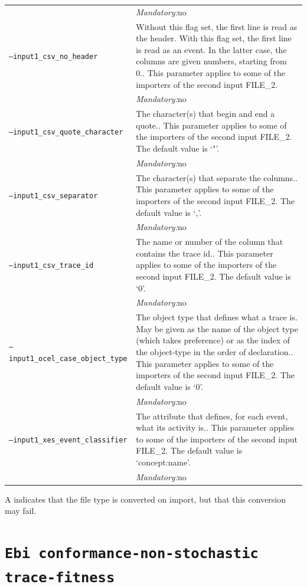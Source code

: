 {\begin{tabularx}{\linewidth}{lX}
&\textit{Mandatory:}\quad no\\
\texttt{--input1\_csv\_no\_header} & Without this flag set, the first line is read as the header. 
    With this flag set, the first line is read as an event. In the latter case, the columns are given numbers, starting from 0.. This parameter applies to some of the importers of the second input FILE\_2. \\
&\textit{Mandatory:}\quad no\\
\texttt{--input1\_csv\_quote\_character} & The character(s) that begin and end a quote.. This parameter applies to some of the importers of the second input FILE\_2. The default value is `"'.\\
&\textit{Mandatory:}\quad no\\
\texttt{--input1\_csv\_separator} & The character(s) that separate the columns.. This parameter applies to some of the importers of the second input FILE\_2. The default value is `,'.\\
&\textit{Mandatory:}\quad no\\
\texttt{--input1\_csv\_trace\_id} & The name or number of the column that contains the trace id.. This parameter applies to some of the importers of the second input FILE\_2. The default value is `0'.\\
&\textit{Mandatory:}\quad no\\
\texttt{--input1\_ocel\_case\_object\_type} & The object type that defines what a trace is. May be given as the name of the object type (which takes preference) or as the index of the object-type in the order of declaration.. This parameter applies to some of the importers of the second input FILE\_2. The default value is `0'.\\
&\textit{Mandatory:}\quad no\\
\texttt{--input1\_xes\_event\_classifier} & The attribute that defines, for each event, what its activity is.. This parameter applies to some of the importers of the second input FILE\_2. The default value is `concept:name'.\\
&\textit{Mandatory:}\quad no\\
\bottomrule
\end{tabularx}
A \textdagger{} indicates that the file type is converted on import, but that this conversion may fail.
\clearpage\section{\texttt{Ebi conformance-non-stochastic trace-fitness}}
\label{command:Ebi conformance-non-stochastic trace-fitness}
}
